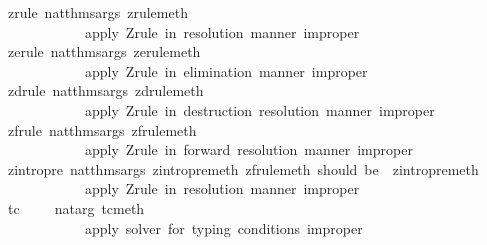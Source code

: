 \begin{isabellebody}
\ \ {\isacharparenleft}{\isachardoublequote}zrule{\isachardoublequote}{\isacharcomma}\ nat{\isacharunderscore}thms{\isacharunderscore}args\ zrule{\isacharunderscore}meth{\isacharcomma}\ \isanewline
\ \ \ \ \ \ \ \ \ \ \ \ \ {\isachardoublequote}apply\ Z{\isacharminus}rule\ in\ resolution\ manner\ {\isacharparenleft}improper{\isacharparenright}{\isachardoublequote}{\isacharparenright}{\isacharcomma}\isanewline
\ \ {\isacharparenleft}{\isachardoublequote}zerule{\isachardoublequote}{\isacharcomma}\ nat{\isacharunderscore}thms{\isacharunderscore}args\ zerule{\isacharunderscore}meth{\isacharcomma}\ \isanewline
\ \ \ \ \ \ \ \ \ \ \ \ \ {\isachardoublequote}apply\ Z{\isacharminus}rule\ in\ elimination\ manner\ {\isacharparenleft}improper{\isacharparenright}{\isachardoublequote}{\isacharparenright}{\isacharcomma}\isanewline
\ \ {\isacharparenleft}{\isachardoublequote}zdrule{\isachardoublequote}{\isacharcomma}\ nat{\isacharunderscore}thms{\isacharunderscore}args\ zdrule{\isacharunderscore}meth{\isacharcomma}\ \isanewline
\ \ \ \ \ \ \ \ \ \ \ \ \ {\isachardoublequote}apply\ Z{\isacharminus}rule\ in\ destruction\ resolution\ manner\ {\isacharparenleft}improper{\isacharparenright}{\isachardoublequote}{\isacharparenright}{\isacharcomma}\isanewline
\ \ {\isacharparenleft}{\isachardoublequote}zfrule{\isachardoublequote}{\isacharcomma}\ nat{\isacharunderscore}thms{\isacharunderscore}args\ zfrule{\isacharunderscore}meth{\isacharcomma}\ \isanewline
\ \ \ \ \ \ \ \ \ \ \ \ \ {\isachardoublequote}apply\ Z{\isacharminus}rule\ in\ forward\ resolution\ manner\ {\isacharparenleft}improper{\isacharparenright}{\isachardoublequote}{\isacharparenright}{\isacharcomma}\isanewline
\ \ {\isacharparenleft}{\isachardoublequote}zintro{\isacharunderscore}pre{\isachardoublequote}{\isacharcomma}\ nat{\isacharunderscore}thms{\isacharunderscore}args\ zintro{\isacharunderscore}pre{\isacharunderscore}meth\ {\isacharparenleft}{\isacharasterisk}zfrule{\isacharunderscore}meth\ should\ be{\isacharcolon}\ \ zintro{\isacharunderscore}pre{\isacharunderscore}meth\ {\isacharasterisk}{\isacharparenright}{\isacharcomma}\ \isanewline
\ \ \ \ \ \ \ \ \ \ \ \ \ {\isachardoublequote}apply\ Z{\isacharminus}rule\ in\ resolution\ manner\ {\isacharparenleft}improper{\isacharparenright}{\isachardoublequote}{\isacharparenright}{\isacharcomma}\isanewline
\ \ {\isacharparenleft}{\isachardoublequote}tc{\isachardoublequote}{\isacharcomma}\ \ \ \ \ nat{\isacharunderscore}arg\ tc{\isacharunderscore}meth{\isacharcomma}\ \isanewline
\ \ \ \ \ \ \ \ \ \ \ \ \ {\isachardoublequote}apply\ solver\ for\ typing\ conditions\ {\isacharparenleft}improper{\isacharparenright}{\isachardoublequote}{\isacharparenright}{\isacharcomma}\isanewline

\end{isabellebody}
